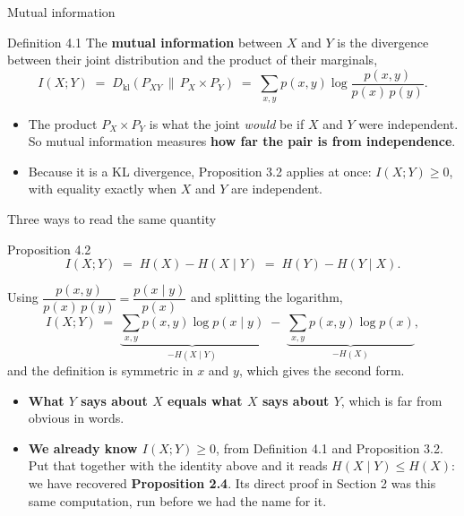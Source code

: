 \documentclass[aspectratio=169,9pt]{beamer}
\newcommand{\orange}[1]{\textcolor{AmazonOrange}{\textbf{#1}}}
\newcommand{\blue}[1]{\textcolor{densityblue}{\textbf{#1}}}
\newcommand{\muted}[1]{\textcolor{EPICMuted}{#1}}
\newcommand{\KL}[2]{D_{\mathrm{kl}}\!\left(#1 \,\|\, #2\right)}
\begin{document}
\begin{frame}{Mutual information}
\begin{block}{Definition 4.1}
The \orange{mutual information} between $X$ and $Y$ is the divergence between their joint distribution and
the product of their marginals,
\vspace{-0.1cm}
\[
    I(X;Y) \;=\; \KL{P_{XY}}{P_X \! \times \! P_Y}
           \;=\; \sum_{x,y} p(x,y) \log \frac{p(x,y)}{p(x)\,p(y)} .
\]
\end{block}
\pause
\vspace{0.05cm}
\begin{itemize}
    \item The product $P_X \! \times \! P_Y$ is what the joint \textit{would} be if $X$ and $Y$ were
    independent. So mutual information measures \blue{how far the pair is from independence}.
    \pause
    \item Because it is a KL divergence, Proposition 3.2 applies at once: $I(X;Y) \ge 0$, with equality
    exactly when $X$ and $Y$ are independent.
\end{itemize}
\end{frame}

\begin{frame}{Three ways to read the same quantity}
\begin{block}{Proposition 4.2}
\[
    I(X;Y) \;=\; H(X) - H(X \mid Y) \;=\; H(Y) - H(Y \mid X).
\]
\end{block}
\pause
\vspace{0.05cm}
Using $\dfrac{p(x,y)}{p(x)\,p(y)} = \dfrac{p(x \mid y)}{p(x)}$ and splitting the logarithm,
\vspace{-0.1cm}
\[
    I(X;Y) \;=\; \underbrace{\sum_{x,y} p(x,y)\log p(x \mid y)}_{\textstyle -H(X \mid Y)}
             \;-\; \underbrace{\sum_{x,y} p(x,y)\log p(x)}_{\textstyle -H(X)} ,
\]
and the definition is symmetric in $x$ and $y$, which gives the second form.
\pause
\vspace{0.02cm}
\begin{itemize}
    \item \orange{What $Y$ says about $X$ equals what $X$ says about $Y$}, which is far from obvious in words.
    \pause
    \item \orange{We already know $I(X;Y) \ge 0$}, from Definition 4.1 and Proposition 3.2. Put that together
    with the identity above and it reads $H(X \mid Y) \le H(X)$: we have recovered \blue{Proposition 2.4}.
    \muted{Its direct proof in Section 2 was this same computation, run before we had the name for it.}
\end{itemize}
\end{frame}
\end{document}
